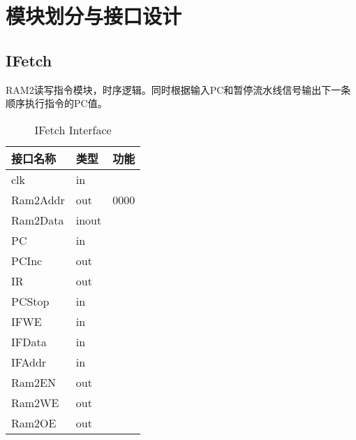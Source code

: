 
\chapter{模块划分与接口设计} %

\label{Chapter4} %


\section{IFetch}
RAM2读写指令模块，时序逻辑。同时根据输入PC和暂停流水线信号输出下一条顺序执行指令的PC值。

\begin{table}[H]
\begin{center}
\renewcommand{\arraystretch}{1.3}
\small
\caption{IFetch Interface}
\label{tab:treatments}
\begin{tabular}{|p{3cm}<{\centering}|p{1.4cm}<{\centering}|p{7cm}<{\centering}|}
\hline
接口名称 & 类型 & 功能 \\
\hline
clk & in & \\
\hline
Ram2Addr & out & 0000 \\
\hline
Ram2Data & inout & \\
\hline
PC & in & \\
\hline
PCInc & out & \\
\hline
IR & out & \\
\hline
PCStop & in & \\
\hline
IFWE & in & \\
\hline
IFData & in &  \\
\hline
IFAddr & in & \\
\hline
Ram2EN & out & \\
\hline
Ram2WE & out & \\
\hline
Ram2OE & out & \\
\hline
\end{tabular}
\end{center}
\end{table}


